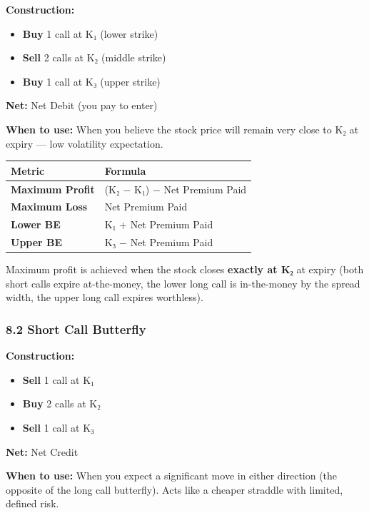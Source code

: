 \documentclass[12pt,openany]{book}
\begin{document}
\textbf{Construction:}
\begin{itemize}[leftmargin=*]
    \item \textbf{Buy} 1 call at K₁ (lower strike)
    \item \textbf{Sell} 2 calls at K₂ (middle strike)
    \item \textbf{Buy} 1 call at K₃ (upper strike)
\end{itemize}

\textbf{Net:} Net Debit (you pay to enter)

\textbf{When to use:} When you believe the stock price will remain very close to K₂ at expiry — low volatility expectation.

\begin{center}
\scriptsize
\setlength{\tabcolsep}{3pt}
\begin{tabular}{|L{6.00cm}|L{6.00cm}|}
\hline
Metric & Formula \\
\hline
\textbf{Maximum Profit} & (K₂ − K₁) − Net Premium Paid \\
\hline
\textbf{Maximum Loss} & Net Premium Paid \\
\hline
\textbf{Lower BE} & K₁ + Net Premium Paid \\
\hline
\textbf{Upper BE} & K₃ − Net Premium Paid \\
\hline
\end{tabular}
\end{center}

Maximum profit is achieved when the stock closes \textbf{exactly at K₂} at expiry (both short calls expire at-the-money, the lower long call is in-the-money by the spread width, the upper long call expires worthless).



\subsubsection{8.2 Short Call Butterfly}

\textbf{Construction:}
\begin{itemize}[leftmargin=*]
    \item \textbf{Sell} 1 call at K₁
    \item \textbf{Buy} 2 calls at K₂
    \item \textbf{Sell} 1 call at K₃
\end{itemize}

\textbf{Net:} Net Credit

\textbf{When to use:} When you expect a significant move in either direction (the opposite of the long call butterfly). Acts like a cheaper straddle with limited, defined risk.
\end{document}
